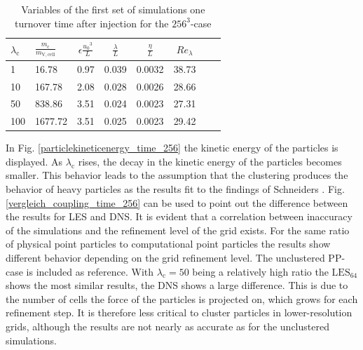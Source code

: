 \documentclass[11pt,a4paper,openany,oneside,parskip=half*]{article}
\begin{document}
\begin{table}[h]
	\begin{center}
	\begin{tabular}{l l | c c c c c c }
	$\lambda_\mathrm{c}$& $\frac{m_\mathrm{c}}{m_\mathrm{V,cell}}$ & $\epsilon \frac{{u_0}^3}{L}$ & $\frac{\lambda}{L}$ & $\frac{\eta}{L} $ & $Re_\lambda$ \\
	\hline
	\hline
	1 &16.78 & 0.97& 0.039 & 0.0032 & 38.73 &\\
	10 &167.78 & 2.08 & 0.028 & 0.0026 & 28.66 &\\
	50 &838.86 & 3.51 & 0.024 & 0.0023 & 27.31 &\\
	100 &1677.72 & 3.51 & 0.025 & 0.0023 & 29.42 &\\
	\hline
	\end{tabular}
	\captionsetup{width=0.9\linewidth}
	\caption{Variables of the first set of simulations one turnover time after injection for the $256^3$-case}
	\label{table_values}
	\end{center}
	\end{table}
In Fig. \ref{particlekineticenergy_time_256} the kinetic energy of the particles is displayed. As $\lambda_\mathrm{c}$ rises, the decay in the kinetic energy of the particles becomes smaller. This behavior leads to the assumption that the clustering produces the behavior of heavy particles as the results fit to the findings of Schneiders \cite{Schneiders2017}. Fig. \ref{vergleich_coupling_time_256} can be used to point out the difference between the results for LES and DNS. It is evident that a correlation between inaccuracy of the simulations and the refinement level of the grid exists. For the same ratio of physical point particles to computational point particles the results show different behavior depending on the grid refinement level. The unclustered PP-case is included as reference. With $\lambda_\mathrm{c}=50$ being a relatively high ratio the $\mathrm{LES}_\mathrm{64}$ shows the most similar results, the DNS shows a large difference. This is due to the number of cells the force of the particles is projected on, which grows for each refinement step. It is therefore less critical to cluster particles in lower-resolution grids, although the results are not nearly as accurate as for the unclustered simulations. 
\end{document}
